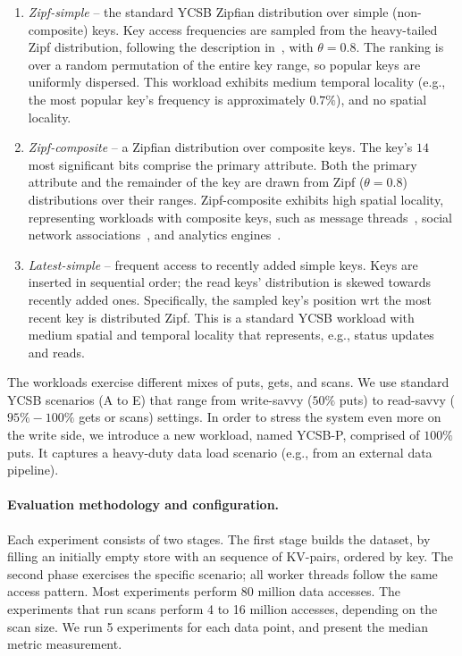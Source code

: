 \begin{enumerate}
\item {\em Zipf-simple} -- the standard YCSB Zipfian distribution over simple (non-composite) keys. 
Key access frequencies are sampled from the heavy-tailed Zipf distribution, 
following the description in~\cite{Gray:1994:QGB:191839.191886}, with $\theta = 0.8$. 
The ranking is over a random permutation of the entire key range, so popular keys are uniformly dispersed.
This workload exhibits 
medium temporal locality (e.g., the most popular key's frequency is approximately $0.7\%$), 
and no spatial locality. 

\item {\em Zipf-composite}  -- a Zipfian distribution over composite keys. 
The key's $14$ most significant bits comprise the primary attribute. Both the primary attribute and 
the remainder of the key are drawn from Zipf ($\theta=0.8$) distributions over their ranges. 
Zipf-composite exhibits high spatial locality, representing workloads 
with composite keys, such as message threads~\cite{Borthakur:2011:AHG:1989323.1989438},
social network associations~\cite{Armstrong:2013:LDB:2463676.2465296}, and analytics engines~\cite{flurry}. 

\item {\em Latest-simple} -- frequent access to recently added simple keys. 
Keys are inserted in sequential  order; the read keys' distribution is skewed towards recently added ones. 
Specifically, the sampled key's position wrt the most recent key is distributed Zipf. This is a 
standard YCSB workload with medium spatial and temporal locality that represents, e.g., status updates and reads. 

\end{enumerate}

The workloads exercise different mixes of puts, gets, and scans. We use standard YCSB scenarios 
(A to E) that range from write-savvy ($50\%$ puts) to read-savvy ($95\%-100\%$ gets or scans) settings. 
In order to stress the system even more on the write side, we introduce a new workload, named 
YCSB-P, comprised of $100\%$ puts. It captures a heavy-duty data load scenario (e.g., from an 
external data pipeline). 

\paragraph{Evaluation methodology and configuration.} Each experiment consists of two stages. The first stage builds 
the dataset, by filling an initially empty store with an sequence of KV-pairs, ordered by key. The second 
phase exercises the specific scenario; all worker threads follow the same access pattern. Most experiments 
perform 80 million data accesses. The experiments that run scans perform 4 to 16 million accesses, depending 
on the scan size. We run 5 experiments for each data point, and present the median metric measurement. 

